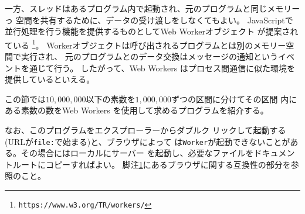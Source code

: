 一方、スレッドはあるプログラム内で起動され、元のプログラムと同じメモリーっ
空間を共有するために、データの受け渡しをしなくてもよい。
\fi
JavaScriptで並行処理を行う機能を提供するものとしてWeb Workerオブジェクト
が提案されている
\footnote{\texttt{https://www.w3.org/TR/workers/}\label{webworkers}}。
Workerオブジェクトは呼び出されるプログラムとは別のメモリー空間で実行され、
元のプログラムとのデータ交換はメッセージの通知というイベントを通じて行う。
したがって、Web Workers はプロセス間通信に似た環境を提供しているといえる。

この節では$10,000,000$以下の素数を$1,000,000$ずつの区間に分けてその区間
 内にある素数の数をWeb Workers を使用して求めるプログラムを紹介する。

 なお、このプログラムをエクスプローラーからダブルク
 リックして起動する(URLが\texttt{file:}で始まる)と、ブラウザによって
 は\texttt{Worker}が起動できないことがある。その場合にはローカルにサーバー
 を起動し、必要なファイルをドキュメントルートにコピーすればよい。
 脚注\ref{webworkers}にあるブラウザに関する互換性の部分を参照のこと。

